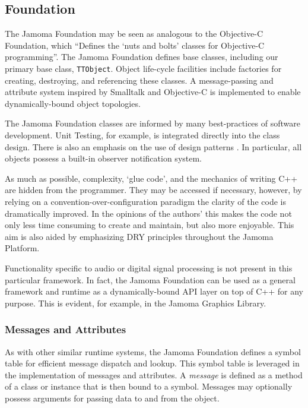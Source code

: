 \documentclass[twoside,10pt]{article}
\begin{document}
\subsection{Foundation} %

The Jamoma Foundation \cite{web7} may be seen as analogous to the Objective-C Foundation, which ``Defines the `nuts and bolts' classes for Objective-C programming''\cite{web8}.  The Jamoma Foundation defines base classes, including our primary base class, \texttt{\small{TTObject}}.  Object life-cycle facilities include factories for creating, destroying, and referencing these classes.  A message-passing and attribute system inspired by Smalltalk and Objective-C is implemented to enable dynamically-bound object topologies.  

The Jamoma Foundation classes are informed by many best-practices of software development.  Unit Testing, for example, is integrated directly into the class design.  There is also an emphasis on the use of design patterns \cite{Gamma:1995}.  In particular, all objects possess a built-in observer notification system.  

As much as possible, complexity, `glue code', and the mechanics of writing C++ are hidden from the programmer.  They may be accessed if necessary, however, by relying on a convention-over-configuration paradigm the clarity of the code is dramatically improved.  In the opinions of the authors' this makes the code not only less time consuming to create and maintain, but also more enjoyable.  This aim is also aided by emphasizing DRY principles throughout the Jamoma Platform.

Functionality specific to audio or digital signal processing is not present in this particular framework.  In fact, the Jamoma Foundation can be used as a general framework and runtime as a dynamically-bound API layer on top of C++ for any purpose.  This is evident, for example, in the Jamoma Graphics Library.

\subsubsection{Messages and Attributes} %

As with other similar runtime systems, the Jamoma Foundation defines a symbol table for efficient message dispatch and lookup.  This symbol table is leveraged in the implementation of messages and attributes.  
A \emph{message} is defined as a method of a class or instance that is then bound to a symbol.  Messages may optionally possess arguments for passing data to and from the object.
\end{document}
